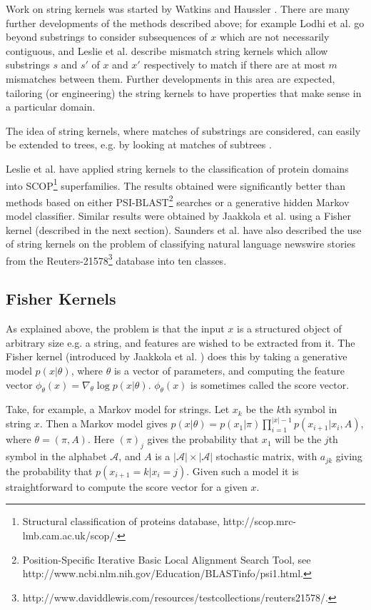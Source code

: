 \documentclass[11pt]{book}
\begin{document}
Work on string kernels was started by Watkins \cite{watkins1999} and Haussler \cite{haussler1999}. There are many further developments of the methods described above; for example Lodhi et al. \cite{lodhi2001} go beyond substrings to consider subsequences of $x$ which are not necessarily contiguous, and Leslie et al. \cite{leslie2003} describe mismatch string kernels which allow substrings $s$ and $s'$ of $x$ and $x'$ respectively to match if there are at most $m$ mismatches between them. Further developments in this area are expected, tailoring (or engineering) the string kernels to have properties that make sense in a particular domain.

The idea of string kernels, where matches of substrings are considered, can easily be extended to trees, e.g. by looking at matches of subtrees \cite{collins2002}.

Leslie et al. \cite{leslie2003} have applied string kernels to the classification of protein domains into SCOP\footnote{Structural classification of proteins database, http://scop.mrc-lmb.cam.ac.uk/scop/.} superfamilies. The results obtained were significantly better than methods based on either PSI-BLAST\footnote{Position-Specific Iterative Basic Local Alignment Search Tool, see http://www.ncbi.nlm.nih.gov/Education/BLASTinfo/psi1.html.} searches or a generative hidden Markov model classifier. Similar results were obtained by Jaakkola et al. \cite{jaakkola2000} using a Fisher kernel (described in the next section). Saunders et al. \cite{saunders2003} have also described the use of string kernels on the problem of classifying natural language newswire stories from the Reuters-21578\footnote{http://www.daviddlewis.com/resources/testcollections/reuters21578/.} database into ten classes.

\subsection{Fisher Kernels}
\label{sec:fisher_kernels}

As explained above, the problem is that the input $x$ is a structured object of arbitrary size e.g. a string, and features are wished to be extracted from it. The Fisher kernel (introduced by Jaakkola et al. \cite{jaakkola2000}) does this by taking a generative model $p(x|\theta)$, where $\theta$ is a vector of parameters, and computing the feature vector $\phi_\theta(x) = \nabla_\theta \log p(x|\theta)$. $\phi_\theta(x)$ is sometimes called the score vector.

Take, for example, a Markov model for strings. Let $x_k$ be the $k$th symbol in string $x$. Then a Markov model gives $p(x|\theta) = p(x_1|\pi) \prod_{i=1}^{|x|-1} p(x_{i+1}|x_i, A)$, where $\theta = (\pi, A)$. Here $(\pi)_j$ gives the probability that $x_1$ will be the $j$th symbol in the alphabet $\mathcal{A}$, and $A$ is a $|\mathcal{A}| \times |\mathcal{A}|$ stochastic matrix, with $a_{jk}$ giving the probability that $p(x_{i+1} = k|x_i = j)$. Given such a model it is straightforward to compute the score vector for a given $x$.
\end{document}
